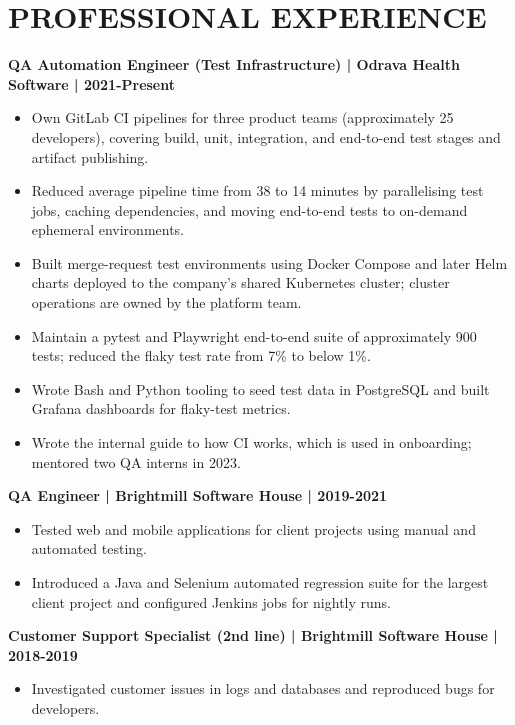 \documentclass[11pt,a4paper]{article}
\begin{document}
\section*{PROFESSIONAL EXPERIENCE}
\textbf{QA Automation Engineer (Test Infrastructure) | Odrava Health Software | 2021-Present}
\begin{itemize}
\item Own GitLab CI pipelines for three product teams (approximately 25 developers), covering build, unit, integration, and end-to-end test stages and artifact publishing.
\item Reduced average pipeline time from 38 to 14 minutes by parallelising test jobs, caching dependencies, and moving end-to-end tests to on-demand ephemeral environments.
\item Built merge-request test environments using Docker Compose and later Helm charts deployed to the company's shared Kubernetes cluster; cluster operations are owned by the platform team.
\item Maintain a pytest and Playwright end-to-end suite of approximately 900 tests; reduced the flaky test rate from 7\% to below 1\%.
\item Wrote Bash and Python tooling to seed test data in PostgreSQL and built Grafana dashboards for flaky-test metrics.
\item Wrote the internal guide to how CI works, which is used in onboarding; mentored two QA interns in 2023.
\end{itemize}
\textbf{QA Engineer | Brightmill Software House | 2019-2021}
\begin{itemize}
\item Tested web and mobile applications for client projects using manual and automated testing.
\item Introduced a Java and Selenium automated regression suite for the largest client project and configured Jenkins jobs for nightly runs.
\end{itemize}
\textbf{Customer Support Specialist (2nd line) | Brightmill Software House | 2018-2019}
\begin{itemize}
\item Investigated customer issues in logs and databases and reproduced bugs for developers.
\end{itemize}
\end{document}
